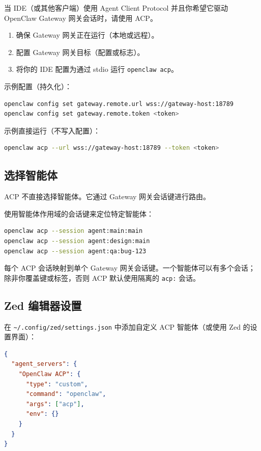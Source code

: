 当 IDE（或其他客户端）使用 Agent Client Protocol 并且你希望它驱动 OpenClaw Gateway 网关会话时，请使用 ACP。

\begin{enumerate}
  \item 确保 Gateway 网关正在运行（本地或远程）。
  \item 配置 Gateway 网关目标（配置或标志）。
  \item 将你的 IDE 配置为通过 stdio 运行 \texttt{openclaw acp}。
\end{enumerate}


示例配置（持久化）：

\begin{lstlisting}[language=bash]
openclaw config set gateway.remote.url wss://gateway-host:18789
openclaw config set gateway.remote.token <token>
\end{lstlisting}


示例直接运行（不写入配置）：

\begin{lstlisting}[language=bash]
openclaw acp --url wss://gateway-host:18789 --token <token>
\end{lstlisting}


\subsection{选择智能体}


ACP 不直接选择智能体。它通过 Gateway 网关会话键进行路由。

使用智能体作用域的会话键来定位特定智能体：

\begin{lstlisting}[language=bash]
openclaw acp --session agent:main:main
openclaw acp --session agent:design:main
openclaw acp --session agent:qa:bug-123
\end{lstlisting}


每个 ACP 会话映射到单个 Gateway 网关会话键。一个智能体可以有多个会话；除非你覆盖键或标签，否则 ACP 默认使用隔离的 \texttt{acp:} 会话。

\subsection{Zed 编辑器设置}


在 \texttt{\textasciitilde{}/.config/zed/settings.json} 中添加自定义 ACP 智能体（或使用 Zed 的设置界面）：

\begin{lstlisting}[language=json]
{
  "agent_servers": {
    "OpenClaw ACP": {
      "type": "custom",
      "command": "openclaw",
      "args": ["acp"],
      "env": {}
    }
  }
}
\end{lstlisting}


